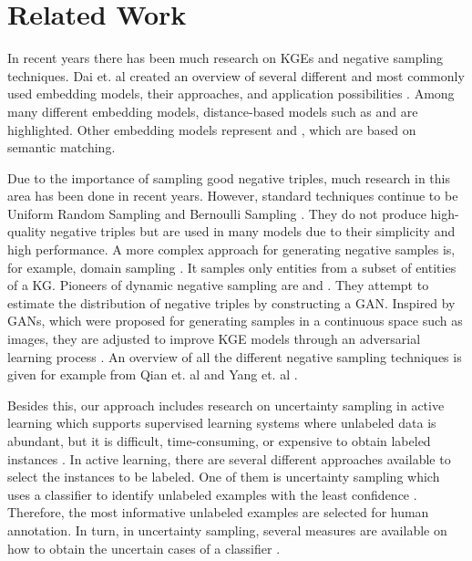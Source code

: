\section{Related Work} 
\label{sec:relatedwork}

In recent years there has been much research on \acp{KGE} and negative sampling techniques.  
Dai et. al created an overview of several different and most commonly used embedding models, their approaches, and application possibilities \cite{electronics9050750}.
Among many different embedding models, distance-based models such as \transe \cite{TransE} and \transd \cite{TransD} are highlighted.
Other embedding models represent \distmult \cite{DistMult} and \complex \cite{ComplEx}, which are based on semantic matching. 

Due to the importance of sampling good negative triples, much research in this area has been done in recent years.
However, standard techniques continue to be Uniform Random Sampling \cite{TransE} and Bernoulli Sampling \cite{TransH}.
They do not produce high-quality negative triples but are used in many models due to their simplicity and high performance.  
A more complex approach for generating negative samples is, for example, domain sampling \cite{domainSampling}.
It samples only entities from a subset of entities of a \ac{KG}.
Pioneers of dynamic negative sampling are \kbgan \cite{cai2017kbgan} and \igan \cite{IGAN}.
They attempt to estimate the distribution of negative triples by constructing a \ac{GAN}.
Inspired by \acp{GAN}, which were proposed for generating samples in a continuous space such as images, they are adjusted to improve \ac{KGE} models through an adversarial learning process \cite{cai2017kbgan}.
An overview of all the different negative sampling techniques is given for example from Qian et. al \cite{qiannegative} and Yang et. al \cite{MCNS}.

Besides this, our approach includes research on uncertainty sampling in active learning which supports supervised learning systems where unlabeled data is abundant, but it is difficult, time-consuming, or expensive to obtain labeled instances \cite{Settles2009ActiveLL}.
In active learning, there are several different approaches available to select the instances to be labeled.
One of them is uncertainty sampling which uses a classifier to identify unlabeled examples with the least confidence \cite{5272205}.
Therefore, the most informative unlabeled examples are selected for human annotation.
In turn, in uncertainty sampling, several measures are available on how to obtain the uncertain cases of a classifier \cite{nguyen2021howtomeasure}.